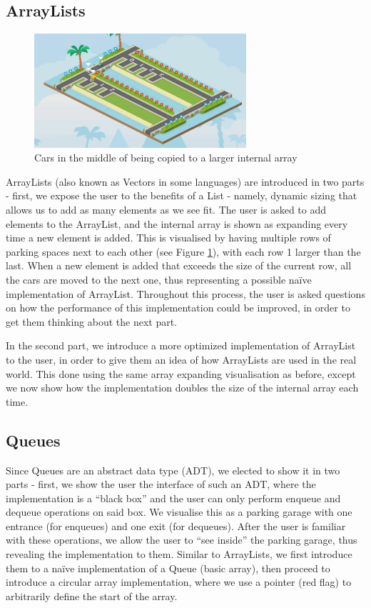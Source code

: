 \documentclass[10pt]{article}
\begin{document}
\subsection{ArrayLists}
\begin{figure}
  \centering
  \includegraphics[width=0.7\textwidth]{images/listcopy.png}
\caption{Cars in the middle of being copied to a larger internal array}
\label{fig:listcopy}
\end{figure}
ArrayLists (also known as Vectors in some languages) are introduced in two parts - first, we expose the user to the benefits of a List - namely, dynamic sizing that allows us to add as many elements as we see fit. The user is asked to add elements to the ArrayList, and the internal array is shown as expanding every time a new element is added. This is visualised by having multiple rows of parking spaces next to each other (see Figure \ref{fig:listcopy}), with each row 1 larger than the last. When a new element is added that exceeds the size of the current row, all the cars are moved to the next one, thus representing a possible naïve implementation of ArrayList. Throughout this process, the user is asked questions on how the performance of this implementation could be improved, in order to get them thinking about the next part.\par
In the second part, we introduce a more optimized implementation of ArrayList to the user, in order to give them an idea of how ArrayLists are used in the real world. This done using the same array expanding visualisation as before, except we now show how the implementation doubles the size of the internal array each time.
\subsection{Queues}
Since Queues are an abstract data type (ADT), we elected to show it in two parts - first, we show the user the interface of such an ADT, where the implementation is a ``black box'' and the user can only perform enqueue and dequeue operations on said box. We visualise this as a parking garage with one entrance (for enqueues) and one exit (for dequeues). After the user is familiar with these operations, we allow the user to ``see inside'' the parking garage, thus revealing the implementation to them. Similar to ArrayLists, we first introduce them to a naïve implementation of a Queue (basic array), then proceed to introduce a circular array implementation, where we use a pointer (red flag) to arbitrarily define the start of the array.
\end{document}
